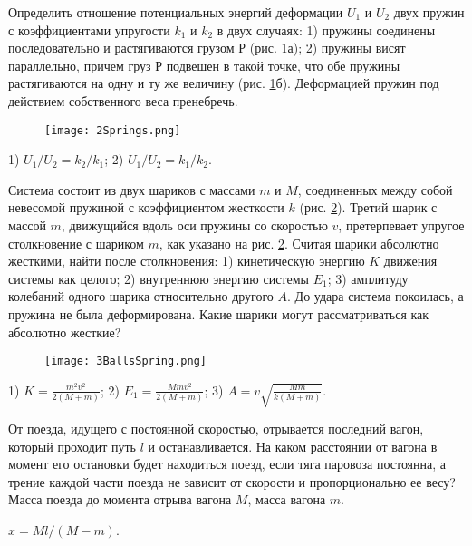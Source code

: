 \begin{ex} %
Определить отношение потенциальных энергий деформации $U_1$ и $U_2$ двух пружин с коэффициентами упругости $k_1$ и $k_2$ в двух случаях: 1) пружины соединены последовательно и растягиваются грузом $Р$ (рис. \ref{2Springs}а); 2) пружины висят параллельно, причем груз $Р$ подвешен в такой точке, что обе пружины растягиваются на одну и ту же величину (рис. \ref{2Springs}б). Деформацией пружин под действием собственного веса пренебречь.

\begin{figure}[h]
\centering
\texttt{[image: 2Springs.png]}
\caption{}
\label{2Springs}
\end{figure}

\begin{ans}
1) $U_1/U_2 = k_2/k_1$; 2) $U_1/U_2 = k_1/k_2$.
\end{ans}
\end{ex}

\complexProblems

\begin{ex} %
Система состоит из двух шариков с массами $m$ и $M$, соединенных между собой невесомой пружиной с коэффициентом жесткости $k$ (рис. \ref{3BallsSpring}). Третий шарик с массой $m$, движущийся вдоль оси пружины со скоростью $v$, претерпевает упругое столкновение с шариком $m$, как указано на рис. \ref{3BallsSpring}. Считая шарики абсолютно жесткими, найти после столкновения: 1) кинетическую энергию $K$ движения системы как целого; 2) внутреннюю энергию системы $E_1$; 3) амплитуду колебаний одного шарика относительно другого $A$. До удара система покоилась, а пружина не была деформирована. Какие шарики могут рассматриваться как абсолютно жесткие?	

\begin{figure}[h]
\centering
\texttt{[image: 3BallsSpring.png]}
\caption{}
\label{3BallsSpring}
\end{figure}

\begin{ans}
1) $K=\frac{m^2v^2}{2(M+m)}$; 2) $E_1 = \frac{Mmv^2}{2(M+m)}$; 3) $A = v\sqrt{\frac{Mm}{k(M+m)}}$.
\end{ans}
\end{ex}

\begin{ex}  %
От поезда, идущего с постоянной скоростью, отрывается последний вагон, который проходит путь $l$ и останавливается. На каком расстоянии от вагона в момент его остановки будет находиться поезд, если тяга паровоза постоянна, а трение каждой части поезда не зависит от скорости и пропорционально ее весу? Масса поезда до момента отрыва вагона $M$, масса вагона $m$.
\begin{ans}
$x = Ml/(M-m)$.
\end{ans}
\end{ex}

